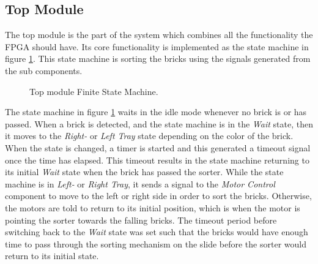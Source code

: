 
\subsection{Top Module}
The top module is the part of the system which combines all the functionality the FPGA should have.
Its core functionality is implemented as the state machine in figure \ref{fig:topmodule_fsm}.
This state machine is sorting the bricks using the signals generated from the sub components.


\begin{figure}[H]
\centering
{}

\caption{Top module Finite State Machine.}
\label{fig:topmodule_fsm}
\end{figure}


The state machine in figure \ref{fig:topmodule_fsm} waits in the idle mode whenever no brick is or has passed.
When a brick is detected, and the state machine is in the \textit{Wait} state, then it moves to the \textit{Right-} or \textit{Left Tray} state depending on the color of the brick.
When the state is changed, a timer is started and this generated a timeout signal once the time has elapsed.
This timeout results in the state machine returning to its initial \textit{Wait} state when the brick has passed the sorter.
While the state machine is in \textit{Left-} or \textit{Right Tray}, it sends a signal to the \textit{Motor Control} component to move to the left or right side in order to sort the bricks.
Otherwise, the motors are told to return to its initial position, which is when the motor is pointing the sorter towards the falling bricks.
The timeout period before switching back to the \textit{Wait} state was set such that the bricks would have enough time to pass through the sorting mechanism on the slide before the sorter would return to its initial state.


